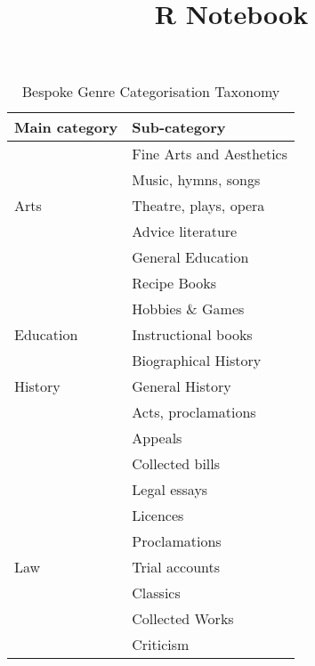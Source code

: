 \documentclass[
]{article}
\title{R Notebook}
\author{}
\date{\vspace{-2.5em}}
\begin{document}
\maketitle

\begin{table}

\caption{\label{tab:unnamed-chunk-1}Bespoke Genre Categorisation Taxonomy}
\centering
\begin{tabular}[t]{ll}
\toprule
Main category & Sub-category\\
\midrule
 & Fine Arts and Aesthetics\\

 & Music, hymns, songs\\

\multirow{-3}{*}{\raggedright\arraybackslash Arts} & Theatre, plays, opera\\
\cmidrule{1-2}
 & Advice literature\\

 & General Education\\

 & Recipe Books\\

 & Hobbies \& Games\\

\multirow{-5}{*}{\raggedright\arraybackslash Education} & Instructional books\\
\cmidrule{1-2}
 & Biographical History\\

\multirow{-2}{*}{\raggedright\arraybackslash History} & General History\\
\cmidrule{1-2}
 & Acts, proclamations\\

 & Appeals\\

 & Collected bills\\

 & Legal essays\\

 & Licences\\

 & Proclamations\\

\multirow{-7}{*}{\raggedright\arraybackslash Law} & Trial accounts\\
\cmidrule{1-2}
 & Classics\\

 & Collected Works\\

 & Criticism\\


\end{tabular}
\end{table}
\end{document}

